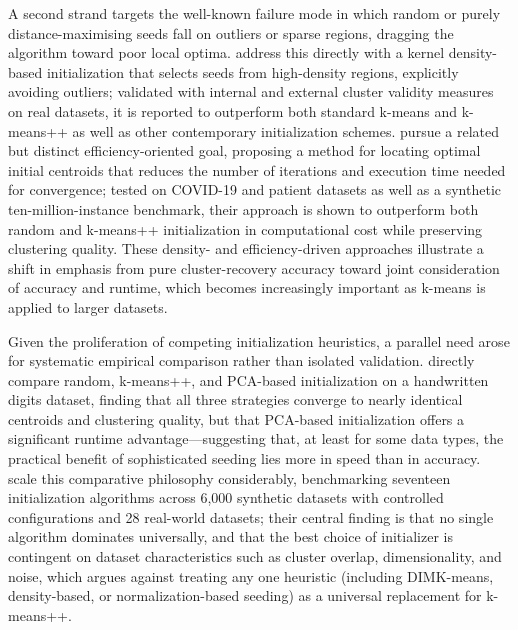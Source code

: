 A second strand targets the well-known failure mode in which random or purely distance-maximising seeds fall on outliers or sparse regions, dragging the algorithm toward poor local optima. \cite{kumar2017density} address this directly with a kernel density-based initialization that selects seeds from high-density regions, explicitly avoiding outliers; validated with internal and external cluster validity measures on real datasets, it is reported to outperform both standard k-means and k-means++ as well as other contemporary initialization schemes. \cite{zubair2022improved} pursue a related but distinct efficiency-oriented goal, proposing a method for locating optimal initial centroids that reduces the number of iterations and execution time needed for convergence; tested on COVID-19 and patient datasets as well as a synthetic ten-million-instance benchmark, their approach is shown to outperform both random and k-means++ initialization in computational cost while preserving clustering quality. These density- and efficiency-driven approaches illustrate a shift in emphasis from pure cluster-recovery accuracy toward joint consideration of accuracy and runtime, which becomes increasingly important as k-means is applied to larger datasets.

Given the proliferation of competing initialization heuristics, a parallel need arose for systematic empirical comparison rather than isolated validation. \cite{li2018experiment} directly compare random, k-means++, and PCA-based initialization on a handwritten digits dataset, finding that all three strategies converge to nearly identical centroids and clustering quality, but that PCA-based initialization offers a significant runtime advantage---suggesting that, at least for some data types, the practical benefit of sophisticated seeding lies more in speed than in accuracy. \cite{harris2022extensive} scale this comparative philosophy considerably, benchmarking seventeen initialization algorithms across 6{,}000 synthetic datasets with controlled configurations and 28 real-world datasets; their central finding is that no single algorithm dominates universally, and that the best choice of initializer is contingent on dataset characteristics such as cluster overlap, dimensionality, and noise, which argues against treating any one heuristic (including DIMK-means, density-based, or normalization-based seeding) as a universal replacement for k-means++.

